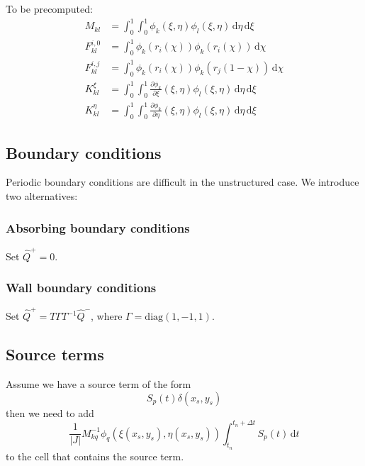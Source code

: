 \documentclass[a4paper]{scrartcl}
\newcommand{\dd}[1]{\,\mathrm{d}#1}
\newcommand{\diag}[1]{\mathrm{diag}\left(#1\right)}
\begin{document}
To be precomputed:
\begin{align*}
 M_{kl} &= \int_{0}^{1}\int_{0}^{1}\phi_k(\xi,\eta)\phi_l(\xi,\eta)\dd{\eta}\dd{\xi} \\
 F_{kl}^{i,0} &= \int_0^1\phi_k(r_i(\chi))\phi_k(r_i(\chi))\dd{\chi} \\
 F_{kl}^{i,j} &= \int_0^1\phi_k(r_i(\chi))\phi_k(r_j(1-\chi))\dd{\chi} \\
 K_{kl}^\xi &= \int_{0}^{1}\int_{0}^{1}\frac{\partial\phi_k}{\partial\xi}(\xi,\eta)\phi_l(\xi,\eta)\dd{\eta}\dd{\xi} \\
 K_{kl}^\eta &= \int_{0}^{1}\int_{0}^{1}\frac{\partial\phi_k}{\partial\eta}(\xi,\eta)\phi_l(\xi,\eta)\dd{\eta}\dd{\xi}
\end{align*}

\subsection{Boundary conditions}
Periodic boundary conditions are difficult in the unstructured case.
We introduce two alternatives:
\subsubsection{Absorbing boundary conditions}
Set $\hat{Q}^+=0$.
\subsubsection{Wall boundary conditions}
Set $\hat{Q}^+=T\Gamma T^{-1}\hat{Q}^-$, where $\Gamma=\diag{1,-1,1}$.

\subsection{Source terms}
Assume we have a source term of the form
\begin{equation}
 S_p(t)\delta(x_s,y_s)
\end{equation}
then we need to add
\begin{equation}
 \frac{1}{|J|}M_{kq}^{-1}\phi_q\left(\xi(x_s,y_s),\eta(x_s,y_s) \right)\int_{t_n}^{t_n+\Delta t} S_p(t)\dd{t}
\end{equation}
to the cell that contains the source term.
\end{document}
